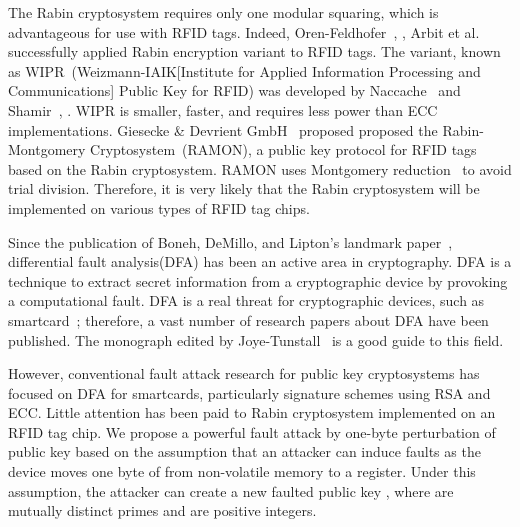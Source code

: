 \documentclass{article}
\begin{document}
The Rabin cryptosystem requires only one modular squaring, which 
is advantageous for use with RFID tags. 
Indeed, Oren-Feldhofer~\cite{Oren-Feldhofer}, \cite{Oren-Feldhofer2}, Arbit et al.~\cite{Implement} 
successfully applied Rabin encryption variant to RFID tags. The variant, known as 
WIPR~(Weizmann-IAIK[Institute for Applied Information Processing and Communications] Public Key for RFID) 
was developed by Naccache~\cite{Naccache} and Shamir~\cite{Shamir}, \cite{Shamir2}. 
WIPR is smaller, faster, and requires less power than ECC implementations. 
Giesecke \& Devrient GmbH~\cite{RAMON} proposed 
proposed the Rabin-Montgomery Cryptosystem~(RAMON), 
a public key protocol for RFID tags based on the Rabin cryptosystem. 
RAMON uses Montgomery reduction~\cite{Mont} to avoid trial division. 
Therefore, it is very likely that the Rabin cryptosystem 
will be implemented on  various types of RFID tag chips. 

Since the publication of Boneh, DeMillo, and Lipton's landmark paper~\cite{Bellcore}, 
differential fault analysis(DFA) has been an active area in cryptography. 
DFA is a technique to extract secret information from a cryptographic device by provoking a computational fault. 
DFA is a real threat for cryptographic devices, such as smartcard~\cite{Bar}; therefore, 
a vast number of research papers about DFA have been published. 
The monograph edited by Joye-Tunstall~\cite{Joye-Tunstall-Book} is a good guide to this field. 

However, conventional fault attack research for public key cryptosystems 
has focused on DFA for smartcards, particularly signature schemes using RSA and ECC. 
Little attention has been paid to Rabin cryptosystem implemented on an RFID tag chip. 
We propose a powerful fault attack by one-byte perturbation of public key 
 based on the assumption that an attacker can induce faults as 
 the device moves one byte of  from non-volatile memory to a register.
Under this assumption, the attacker can create a new faulted public key , 
where  are mutually distinct primes and  are positive integers. 
\end{document}
